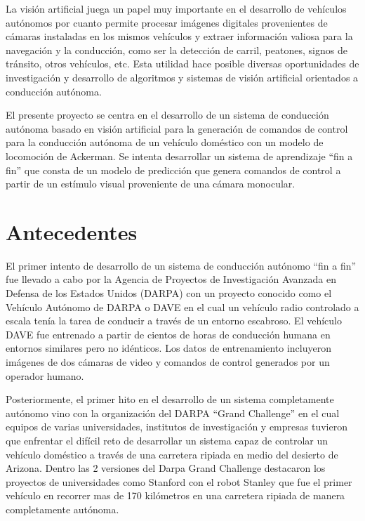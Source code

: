 \documentclass[12pt,letterpaper]{article}
\begin{document}
La visión artificial juega un papel muy importante en el desarrollo de vehículos autónomos por cuanto permite 
procesar imágenes digitales provenientes de cámaras instaladas en los mismos vehículos y extraer información 
valiosa para la navegación y la conducción, como ser la detección de carril, peatones, signos de tránsito, otros vehículos, 
etc. Esta utilidad hace posible diversas oportunidades de investigación y desarrollo de algoritmos y sistemas de visión 
artificial orientados a conducción autónoma.

El presente proyecto se centra en el desarrollo de un sistema de conducción autónoma basado en visión artificial para 
la generación de comandos de control para la conducción autónoma de un vehículo doméstico con un modelo de locomoción 
de Ackerman. Se intenta desarrollar un sistema de aprendizaje “fin a fin” que consta de un modelo de predicción 
que genera comandos de control a partir de un estímulo visual proveniente de una cámara monocular.

\section{Antecedentes}

El primer intento de desarrollo de un sistema de conducción autónomo “fin a fin” fue llevado a cabo por la Agencia 
de Proyectos de Investigación Avanzada en Defensa de los Estados Unidos (DARPA) con un proyecto conocido 
como el Vehículo Autónomo de DARPA o DAVE \cite{lecun2004dave} en el cual un vehículo radio controlado a escala tenía la 
tarea de conducir a través de un entorno escabroso. El vehículo DAVE fue entrenado a partir de cientos de
horas de conducción humana en entornos similares pero no idénticos. Los datos de entrenamiento 
incluyeron imágenes de dos cámaras de video y comandos de control generados por un operador humano. 

Posteriormente, el primer hito en el desarrollo de un sistema completamente autónomo vino 
con la organización del DARPA “Grand Challenge” en el cual equipos de varias universidades, 
institutos de investigación y empresas tuvieron que enfrentar el difícil reto de desarrollar 
un sistema capaz de controlar un vehículo doméstico a través de una carretera 
ripiada en medio del desierto de Arizona. Dentro las 2 versiones del Darpa Grand Challenge 
destacaron los proyectos de universidades como Stanford con el robot Stanley \cite{Thrun2006} que fue el primer 
vehículo en recorrer mas de 170 kilómetros en una carretera ripiada de manera completamente autónoma. 
\end{document}
